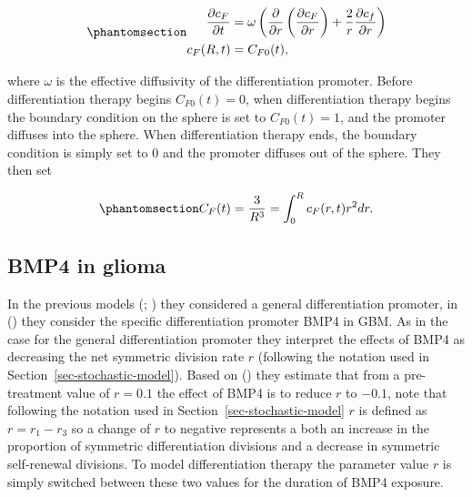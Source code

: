 \documentclass[
  letterpaper,
]{scrreprt}
\theoremstyle{definition}
\theoremstyle{remark}
\begin{document}
\begin{equation}\phantomsection\label{eq-bachman-CF}{
\begin{aligned}
\frac{\partial c_F}{\partial t} &= \omega \left( \frac{\partial}{\partial r} \left(\frac{\partial c_F}{\partial r} \right) + \frac{2}{r} \frac{\partial c_f}{\partial r}   \right) \\
c_F(R,t) &= C_{F0}(t),
\end{aligned}
}\end{equation}

where \(\omega\) is the effective diffusivity of the differentiation
promoter. Before differentiation therapy begins \(C_{F0}(t) = 0\), when
differentiation therapy begins the boundary condition on the sphere is
set to \(C_{F0}(t) = 1\), and the promoter diffuses into the sphere.
When differentiation therapy ends, the boundary condition is simply set
to 0 and the promoter diffuses out of the sphere. They then set

\begin{equation}\phantomsection\label{eq-bachman-CF2}{
C_F(t) = \frac{3}{R^3} = \int^R_0 c_F (r,t) r^2 dr.
}\end{equation}

\subsection{BMP4 in glioma}\label{bmp4-in-glioma}

In the previous models (; ) they considered a general differentiation promoter, in
() they consider the
specific differentiation promoter BMP4 in GBM. As in the case for the
general differentiation promoter they interpret the effects of BMP4 as
decreasing the net symmetric division rate \(r\) (following the notation
used in Section~\ref{sec-stochastic-model}). Based on
() they estimate
that from a pre-treatment value of \(r = 0.1\) the effect of BMP4 is to
reduce \(r\) to \(-0.1\), note that following the notation used in
Section~\ref{sec-stochastic-model} \(r\) is defined as \(r = r_1-r_3\)
so a change of \(r\) to negative represents a both an increase in the
proportion of symmetric differentiation divisions and a decrease in
symmetric self-renewal divisions. To model differentiation therapy the
parameter value \(r\) is simply switched between these two values for
the duration of BMP4 exposure.
\end{document}

